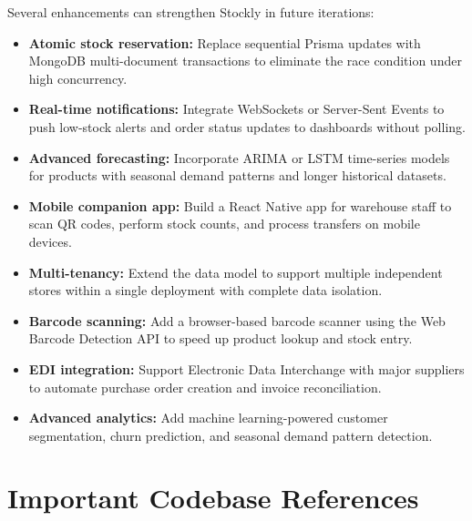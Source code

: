 \documentclass[12pt,a4paper]{report}
\begin{document}
Several enhancements can strengthen Stockly in future iterations:
\begin{itemize}
    \item \textbf{Atomic stock reservation:} Replace sequential Prisma updates with MongoDB multi-document transactions to eliminate the race condition under high concurrency.
    \item \textbf{Real-time notifications:} Integrate WebSockets or Server-Sent Events to push low-stock alerts and order status updates to dashboards without polling.
    \item \textbf{Advanced forecasting:} Incorporate ARIMA or LSTM time-series models for products with seasonal demand patterns and longer historical datasets.
    \item \textbf{Mobile companion app:} Build a React Native app for warehouse staff to scan QR codes, perform stock counts, and process transfers on mobile devices.
    \item \textbf{Multi-tenancy:} Extend the data model to support multiple independent stores within a single deployment with complete data isolation.
    \item \textbf{Barcode scanning:} Add a browser-based barcode scanner using the Web Barcode Detection API to speed up product lookup and stock entry.
    \item \textbf{EDI integration:} Support Electronic Data Interchange with major suppliers to automate purchase order creation and invoice reconciliation.
    \item \textbf{Advanced analytics:} Add machine learning-powered customer segmentation, churn prediction, and seasonal demand pattern detection.
\end{itemize}

\appendix

\chapter{Important Codebase References}
\end{document}
